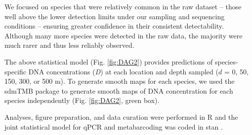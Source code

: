 \documentclass{article}
\begin{document}
We focused on species that were relatively common in the raw dataset – those well above the lower detection limits under our sampling and sequencing conditions – ensuring greater confidence in their consistent detectability. Although many more species were detected in the raw data, the majority were much rarer and thus less reliably observed.

The above statistical model (Fig. \ref{fig:DAG2}) provides predictions of species-specific DNA concentrations (\textit{D}) at each location and depth sampled ($d$ = 0, 50, 150, 300, or 500 m). To generate smooth maps for each species, we used the sdmTMB package \cite{anderson2022} to generate smooth maps of DNA concentration for each species independently (Fig. \ref{fig:DAG2}, green box). 


Analyses, figure preparation, and data curation were performed in R \cite{rcoreteam2024} and the joint statistical model for qPCR and metabarcoding was coded in stan \cite{standevelopmentteam2023}.


\end{document}
